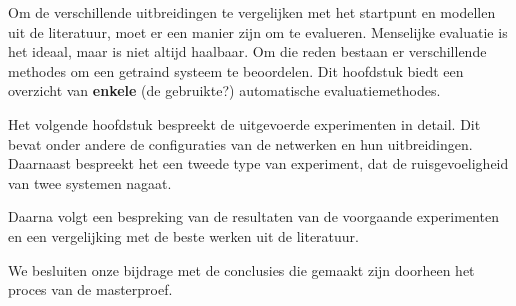 Om de verschillende uitbreidingen te vergelijken met het startpunt en modellen uit de literatuur, moet er een manier zijn om te evalueren. Menselijke evaluatie is het ideaal, maar is niet altijd haalbaar. Om die reden bestaan er verschillende methodes om een getraind systeem te beoordelen. Dit hoofdstuk biedt een overzicht van \textbf{enkele} (de gebruikte?) automatische evaluatiemethodes.

Het volgende hoofdstuk bespreekt de uitgevoerde experimenten in detail. Dit bevat onder andere de configuraties van de netwerken en hun uitbreidingen. Daarnaast bespreekt het een tweede type van experiment, dat de ruisgevoeligheid van twee systemen nagaat.

Daarna volgt een bespreking van de resultaten van de voorgaande experimenten en een vergelijking met de beste werken uit de literatuur.

We besluiten onze bijdrage met de conclusies die gemaakt zijn doorheen het proces van de masterproef.
 
